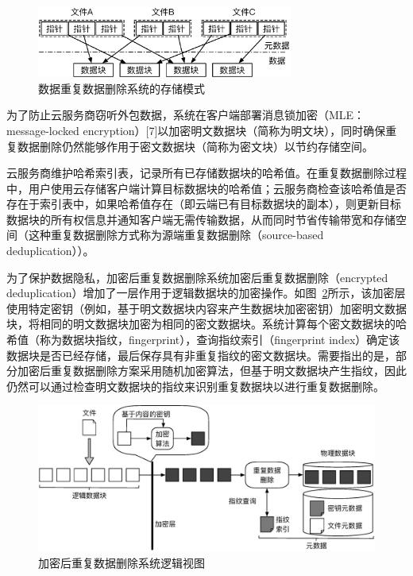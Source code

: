 \begin{figure}[!htb]
    \small
    \centering
    \includegraphics[width=0.75\textwidth]{pic/DedupSystemStorageMode.eps}
    \caption{数据重复数据删除系统的存储模式} 
    \label{fig:Deduplication-storage-pattern}
\end{figure}


为了防止云服务商窃听外包数据，系统在客户端部署消息锁加密（MLE：message-locked encryption）[7]以加密明文数据块（简称为明文块），同时确保重复数据删除仍然能够作用于密文数据块（简称为密文块）以节约存储空间。


云服务商维护哈希索引表，记录所有已存储数据块的哈希值。在重复数据删除过程中，用户使用云存储客户端计算目标数据块的哈希值；云服务商检查该哈希值是否存在于索引表中，如果哈希值存在（即云端已有目标数据块的副本），则更新目标数据块的所有权信息并通知客户端无需传输数据，从而同时节省传输带宽和存储空间（这种重复数据删除方式称为源端重复数据删除（source-based deduplication））。



为了保护数据隐私，加密后重复数据删除系统加密后重复数据删除（encrypted deduplication）增加了一层作用于逻辑数据块的加密操作。如图~\ref{fig:Encrypted-deduplication-storage-logic}所示，该加密层使用特定密钥（例如，基于明文数据块内容来产生数据块加密密钥\cite{bellare2013message}）加密明文数据块，将相同的明文数据块加密为相同的密文数据块。系统计算每个密文数据块的哈希值（称为数据块指纹，fingerprint），查询指纹索引（fingerprint index）确定该数据块是否已经存储，最后保存具有非重复指纹的密文数据块。需要指出的是，部分加密后重复数据删除方案\cite{bellare2013message}采用随机加密算法，但基于明文数据块产生指纹，因此仍然可以通过检查明文数据块的指纹来识别重复数据块以进行重复数据删除。

\begin{figure}[!htb]
    \small
    \centering
    \includegraphics[width=\textwidth]{pic/EncryptDedupSystemLogic.eps}
    \caption{加密后重复数据删除系统逻辑视图}
    \label{fig:Encrypted-deduplication-storage-logic}
\end{figure}

